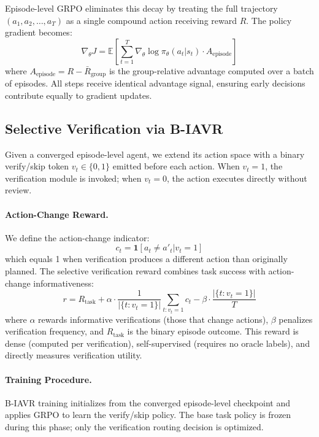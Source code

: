 \documentclass[11pt]{article}
\begin{document}
Episode-level GRPO eliminates this decay by treating the full trajectory $(a_1, a_2, \ldots, a_T)$ as a single compound action receiving reward $R$. The policy gradient becomes:
\begin{equation}
\nabla_\theta J = \mathbb{E}\left[ \sum_{t=1}^T \nabla_\theta \log \pi_\theta(a_t | s_t) \cdot A_{\text{episode}} \right]
\end{equation}
where $A_{\text{episode}} = R - \bar{R}_{\text{group}}$ is the group-relative advantage computed over a batch of episodes. All steps receive identical advantage signal, ensuring early decisions contribute equally to gradient updates.

\subsection{Selective Verification via B-IAVR}

Given a converged episode-level agent, we extend its action space with a binary verify/skip token $v_t \in \{0, 1\}$ emitted before each action. When $v_t = 1$, the verification module is invoked; when $v_t = 0$, the action executes directly without review.

\paragraph{Action-Change Reward.}
We define the action-change indicator:
\begin{equation}
c_t = \mathbf{1}[a_t \neq a'_t | v_t = 1]
\end{equation}
which equals 1 when verification produces a different action than originally planned. The selective verification reward combines task success with action-change informativeness:
\begin{equation}
r = R_{\text{task}} + \alpha \cdot \frac{1}{|\{t: v_t=1\}|}\sum_{t: v_t=1} c_t - \beta \cdot \frac{|\{t: v_t=1\}|}{T}
\end{equation}
where $\alpha$ rewards informative verifications (those that change actions), $\beta$ penalizes verification frequency, and $R_{\text{task}}$ is the binary episode outcome. This reward is dense (computed per verification), self-supervised (requires no oracle labels), and directly measures verification utility.

\paragraph{Training Procedure.}
B-IAVR training initializes from the converged episode-level checkpoint and applies GRPO to learn the verify/skip policy. The base task policy is frozen during this phase; only the verification routing decision is optimized.
\end{document}
